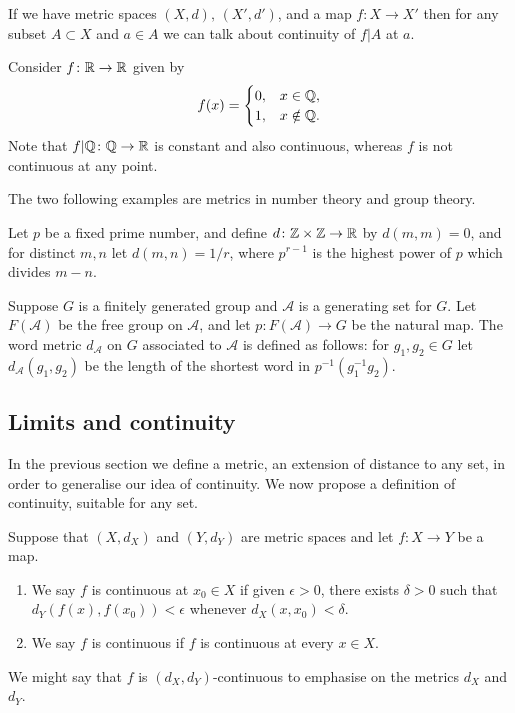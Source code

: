 \documentclass[main.tex]{subfiles}
\begin{document}
			If we have metric spaces $(X,d),\,(X',d')$, and a map $f\colon X \to X'$ then for any subset $A \subset X$ and $a \in A$ we can talk about continuity of $f|A$ at $a$.
		\begin{example}
			Consider $f\colon\mathbb R\to\mathbb R$ given by
			\begin{equation*}
				f(x) = \begin{cases}
					0, & x \in \mathbb Q,\\
					1, & x \notin \mathbb Q.
				\end{cases}
			\end{equation*}
			Note that $f|\mathbb Q \colon \mathbb Q \to \mathbb R$ is constant and also continuous, whereas $f$ is not continuous at any point.
		\end{example}
		The two following examples are metrics in number theory and group theory.
		\begin{example}
			Let $p$ be a fixed prime number, and define $d\colon \mathbb Z\times\mathbb Z \to \mathbb R$ by $d(m,m) = 0$, and for distinct $m, n$ let $d(m,n) = 1/r$, where $p^{r - 1}$ is the highest power of $p$ which divides $m - n$.
		\end{example}
		\begin{example}
			Suppose $G$ is a finitely generated group and $\mathcal{A}$ is a generating set for $G$. Let $F(\mathcal{A})$ be the free group on $\mathcal{A}$, and let $p \colon F(\mathcal{A})\to G$ be the natural map. The word metric $d_\mathcal{A}$ on $G$ associated to $\mathcal{A}$ is defined as follows: for $g_1, g_2 \in G$ let $d_\mathcal{A}(g_1, g_2)$ be the length of the shortest word in $p^{-1}(g^{-1}_1g_2)$.
		\end{example}
	\subsection{Limits and continuity}
		In the previous section we define a metric, an extension of distance to any set, in order to generalise our idea of continuity. We now propose a definition of continuity, suitable for any set. 
		\begin{definition}
			Suppose that $(X, d_X)$ and $(Y, d_Y)$ are metric spaces and let $f \colon X \to Y$ be a map.
			\begin{enumerate}
				\item We say $f$ is continuous at $x_0 \in X$ if given $\epsilon > 0$, there exists $\delta > 0$ such that $d_Y(f(x), f(x_0)) < \epsilon$ whenever $d_X(x, x_0) < \delta$.
				\item We say $f$ is continuous if $f$ is continuous at every $x \in X$.
			\end{enumerate}
		\end{definition}
		We might say that $f$ is $(d_X, d_Y)$-continuous to emphasise on the metrics $d_X$ and $d_Y$.
		
\end{document}
